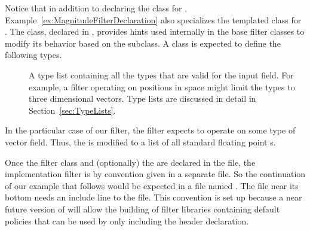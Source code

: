 

Notice that in addition to declaring the class for , Example~\ref{ex:MagnitudeFilterDeclaration} also specializes the  templated class for .
The  class, declared in , provides hints used internally in the base filter classes to modify its behavior based on the subclass.
A  class is expected to define the following types.
\begin{description}
\item[]
  A type list containing all the types that are valid for the input field.
  For example, a filter operating on positions in space might limit the types to three dimensional vectors.
  Type lists are discussed in detail in Section~\ref{sec:TypeLists}.
\end{description}

In the particular case of our  filter, the filter expects to operate on some type of vector field.
Thus, the  is modified to a list of all standard floating point s.

Once the filter class and (optionally) the  are declared in the  file, the implementation filter is by convention given in a separate  file.
So the continuation of our example that follows would be expected in a file named .
The  file near its bottom needs an include line to the  file.
This convention is set up because a near future version of \VTKm will allow the building of filter libraries containing default policies that can be used by only including the header declaration.

